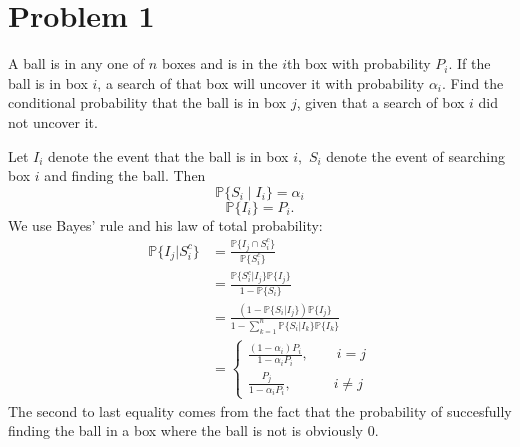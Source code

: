 \documentclass[11pt]{article}
\newcommand{\bbP}{\mathbb{P}}
\begin{document}
	
	
	\psetheader

\section*{Problem 1}
\begin{problem}
    A ball is in any one of $n$ boxes and is in the $i$th box with probability $P_i$. If the ball is in box $i$, a search of that box will uncover it with probability $\alpha_i$. Find the conditional probability that the ball is in box $j$, given that a search of box $i$ did not uncover it.
\end{problem}
\begin{solution}
    Let $I_i$ denote the event that the ball is in box $i,$ $S_i$ denote the event of searching box $i$ and finding the ball. Then 
    \[\bbP\{S_i \mid I_i\} = \alpha_i\]
    \[\bbP\{I_i\} = P_i.\] We use Bayes' rule and his law of total probability:
    \begin{align*}
        \bbP\{I_j | S_i^c\} &= \frac{\bbP\{I_j \cap S_i^c\}}{\bbP\{S_i^c\}}\\
        &= \frac{\bbP\{S_i^c | I_j\}\bbP\{I_j\}}{1 - \bbP\{S_i\}}\\
        &= \frac{(1-\bbP\{S_i | I_j\})\bbP\{I_j\}}{1 - \sum_{k=1}^n\bbP\{S_i | I_k\}\bbP\{I_k\}}\\
        &= \boxed{\begin{cases}
            \frac{(1 - \alpha_i) P_i}{1-\alpha_iP_i}, \qquad i=j\\
            \frac{P_j}{1 - \alpha_iP_i}, \qquad \quad i\neq j
        \end{cases}}
    \end{align*}
    The second to last equality comes from the fact that the probability of succesfully finding the ball in a box where the ball is not is obviously $0.$
\end{solution}

\newpage
\end{document}
